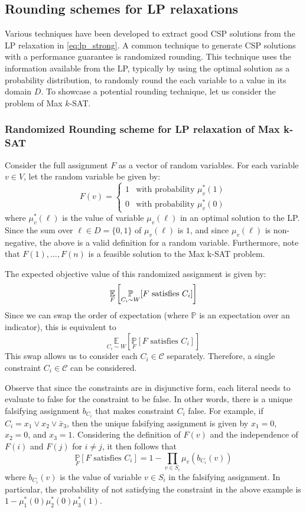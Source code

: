 \subsection{Rounding schemes for LP relaxations}
Various techniques have been developed to extract good CSP solutions from the LP relaxation in \eqref{eq:lp_strong}.
A common technique to generate CSP solutions with a performance guarantee is randomized rounding.
This technique uses the information available from the LP, typically by using the optimal solution as a probability distribution, to randomly round the each variable to a value in its domain $D$.
To showcase a potential rounding technique, let us consider the problem of Max $k$-SAT.

\subsubsection{Randomized Rounding scheme for LP relaxation of Max k-SAT}
Consider the full assignment $F$ as a vector of random variables. For each variable $v \in V$, let the random variable be given by:
\[
	F(v) = \begin{cases}
	1 & \text{with probability } \mu^*_v(1)\\
	0 & \text{with probability } \mu^*_v(0)
	\end{cases}
\]
where $\mu^*_v(\ell)$ is the value of variable $\mu_v(\ell)$ in an optimal solution to the LP.
Since the sum over $\ell \in D = \{0,1\}$ of  $\mu_v(\ell)$ is $1$, and since $\mu_v(\ell)$ is non-negative, the above is a valid definition for a random variable. 
Furthermore, note that $F(1), \dots, F(n)$ is a feasible solution to the Max k-SAT problem.

The expected objective value of this randomized assignment is given by:
\[
	\underset{F}{\mathbb{E}}\left[ \underset{C_i \sim W}{\mathbb{P}}[ F \text{ satisfies } C_i] \right]
\]
Since we can swap the order of expectation (where $\mathbb{P}$ is an expectation over an indicator), this is equivalent to
\[
\underset{C_i \sim W}{\mathbb{E}}\left[ \underset{F}{\mathbb{P}}[ F \text{ satisfies } C_i] \right]
\]
This swap allows us to consider each $C_i \in \mathcal{C}$ separately. 
Therefore, a single constraint $C_i \in \mathcal{C}$ can be considered.

Observe that since the constraints are in disjunctive form, each literal needs to evaluate to false for the constraint to be false. 
In other words, there is a unique falsifying assignment $b_{C_i}$ that makes constraint $C_i$ false. 
For example, if $C_i = x_1 \vee x_2 \vee \bar{x}_3$, then the unique falsifying assignment is given by $x_1 = 0$, $x_2 = 0$, and $x_3 = 1$. 
Considering the definition of $F(v)$ and the independence of $F(i)$ and $F(j)$ for $i \neq j$, it then follows that 
\begin{equation}
		\underset{F}{\mathbb{P}}[ F \text{ satisfies } C_i] = 1 - \prod_{v \in S_i} \mu_v(b_{C_i}(v)) \label{eq:objectiveRounding}
\end{equation}
where $b_{C_i}(v)$ is the value of variable $v \in S_i$ in the falsifying assignment. 
In particular, the probability of not satisfying the constraint in the above example is $ 1- \mu_1^*(0) \mu_2^*(0) \mu_3^*(1)$.


